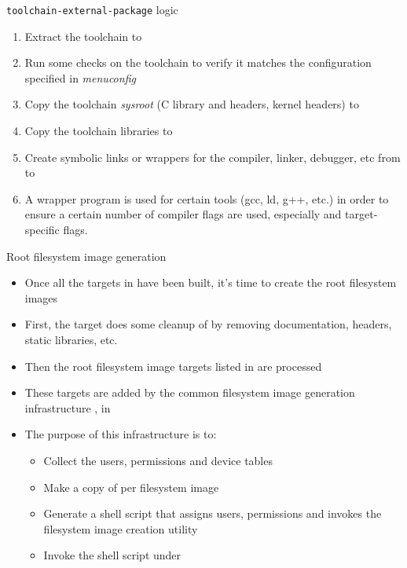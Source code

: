 \begin{frame}{{\tt toolchain-external-package} logic}
  \begin{enumerate}
  \item Extract the toolchain to 
  \item Run some checks on the toolchain to verify it matches the
    configuration specified in {\em menuconfig}
  \item Copy the toolchain {\em sysroot} (C library and headers,
    kernel headers) to 
  \item Copy the toolchain libraries to 
  \item Create symbolic links or wrappers for the compiler, linker,
    debugger, etc from  to
  \item A wrapper program is used for certain tools (gcc, ld, g++,
    etc.) in order to ensure a certain number of compiler flags are
    used, especially  and
    target-specific flags.
  \end{enumerate}
\end{frame}

\begin{frame}{Root filesystem image generation}
  \begin{itemize}
  \item Once all the targets in  have been built,
    it's time to create the root filesystem images
  \item First, the  target does some cleanup of
     by removing documentation, headers, static
    libraries, etc.
  \item Then the root filesystem image targets listed in
     are processed
  \item These targets are added by the common filesystem image
    generation infrastructure , in 
  \item The purpose of this infrastructure is to:
    \begin{itemize}
    \item Collect the users, permissions and device tables
    \item Make a copy of  per filesystem image
    \item Generate a shell script that assigns users, permissions and
      invokes the filesystem image creation utility
    \item Invoke the shell script under 
    \end{itemize}
  \end{itemize}
\end{frame}

